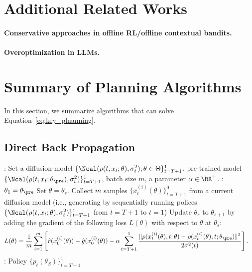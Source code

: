 


\section{Additional Related Works}\label{sec:additional}

\paragraph{Conservative approaches in offline RL/offline contextual bandits. }



\paragraph{Overoptimization in LLMs.}






\section{Summary of Planning Algorithms}\label{sec:sum_planning}

In this section, we summarize algorithms that can solve  Equation~\eqref{eq:key_plnanning}. 

\subsection{Direct Back Propagation}

\begin{algorithm}[!t]
\caption{Direct Back Propagation }\label{alg:main}
\begin{algorithmic}[1]
     : Set a diffusion-model $\{\Ncal(\rho(t,x_{t};\theta),\sigma^2_t); \theta \in \Theta\}_{t=T+1}^1$, pre-trained model $\{\Ncal(\rho(t,x_{t};\theta_{\pre}),\sigma^2_t)\}_{t=T+1}^1$, batch size $m$, a parameter $\alpha \in \RR^+$. 
     : $\theta_1 = \theta_{\pre}$
      \STATE Set $\theta = \theta_s$. 
      \STATE Collect $m$ samples $\{x^{(i)}_t(\theta) \}_{t=T+1}^0$ from a current diffusion model (i.e., generating by sequentially running polices $\{\Ncal(\rho(t,x_{t};\theta),\sigma^2_t)\}_{t=T+1}^1$ from $t=T+1$ to $t=1$) 
      \STATE Update $\theta_s$ to $\theta_{s+1}$ by adding the gradient of the following loss $L(\theta)$ with respect to $\theta$ at $\theta_s$: 
      \begin{align}\label{eq:key}
   & L(\theta) = \frac{1}{m} \sum_{i=1}^m  \left[\hat r(x^{(i)}_0(\theta) ) - \hat g(x^{(i)}_0(\theta) ) -  \alpha     \sum_{t=T+1}^1 \frac{\|\rho(x^{(i)}_t(\theta),t;\theta)-\rho(x^{(i)}_t(\theta),t; \theta_{\pre}) \|^2 }{2\sigma^2(t) } \right ] . 
      \end{align}  
      \ENDFOR
  : Policy $\{p_t(\theta_S) \}_{t=T+1}^1$   
\end{algorithmic}
\end{algorithm}


